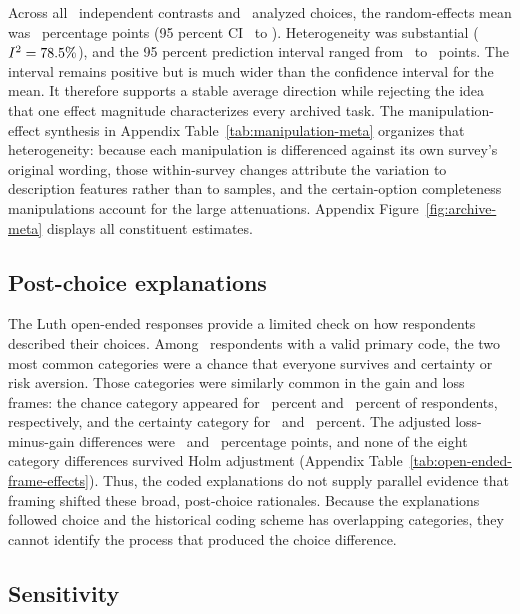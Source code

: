\documentclass[11pt]{article}
\begin{document}
Across all \ArchiveMetaK\ independent contrasts and \ArchiveMetaN\ analyzed choices, the random-effects mean was \ArchiveMetaEffect\ percentage points (95 percent CI \ArchiveMetaLow\ to \ArchiveMetaHigh). Heterogeneity was substantial ($I^2=78.5\%$), and the 95 percent prediction interval ranged from \ArchiveMetaPredLow\ to \ArchiveMetaPredHigh\ points. The interval remains positive but is much wider than the confidence interval for the mean. It therefore supports a stable average direction while rejecting the idea that one effect magnitude characterizes every archived task. The manipulation-effect synthesis in Appendix Table~\ref{tab:manipulation-meta} organizes that heterogeneity: because each manipulation is differenced against its own survey's original wording, those within-survey changes attribute the variation to description features rather than to samples, and the certain-option completeness manipulations account for the large attenuations. Appendix Figure~\ref{fig:archive-meta} displays all constituent estimates.



\subsection{Post-choice explanations}

The Luth open-ended responses provide a limited check on how respondents described their choices. Among \OpenEndedN\ respondents with a valid primary code, the two most common categories were a chance that everyone survives and certainty or risk aversion. Those categories were similarly common in the gain and loss frames: the chance category appeared for \OpenEndedChanceGain\ percent and \OpenEndedChanceLoss\ percent of respondents, respectively, and the certainty category for \OpenEndedCertaintyGain\ and \OpenEndedCertaintyLoss\ percent. The adjusted loss-minus-gain differences were \OpenEndedChanceDiff\ and \OpenEndedCertaintyDiff\ percentage points, and none of the eight category differences survived Holm adjustment (Appendix Table~\ref{tab:open-ended-frame-effects}). Thus, the coded explanations do not supply parallel evidence that framing shifted these broad, post-choice rationales. Because the explanations followed choice and the historical coding scheme has overlapping categories, they cannot identify the process that produced the choice difference.

\subsection{Sensitivity}
\end{document}
